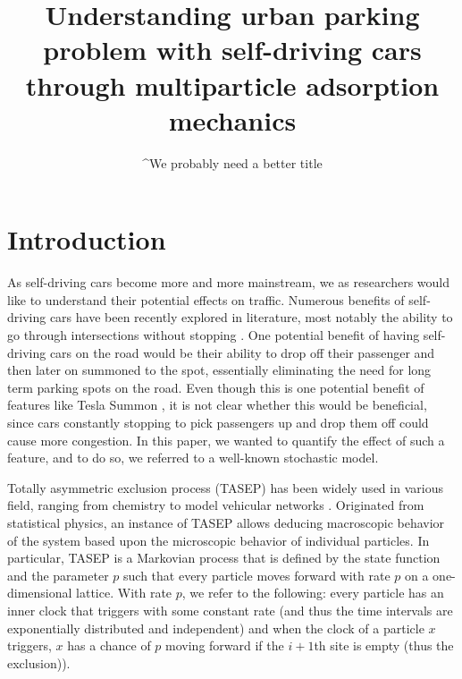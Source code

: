\documentclass[]{article}
\title{Understanding urban parking problem with self-driving cars through multiparticle adsorption mechanics}
\author{^We probably need a better title}
\begin{document}
\maketitle

\section*{Introduction}








As self-driving cars become more and more mainstream, we as researchers would like to understand their potential effects on traffic. Numerous benefits of self-driving cars have been recently explored in literature, most notably the ability to go through intersections without stopping \cite{mitSmartIntersect}. One potential benefit of having self-driving cars on the road would be their ability to drop off their passenger and then later on summoned to the spot, essentially eliminating the need for long term parking spots on the road. Even though this is one potential benefit of features like Tesla Summon \cite{teslaSummon}, it is not clear whether this would be beneficial, since cars constantly stopping to pick passengers up and drop them off could cause more congestion. In this paper, we wanted to quantify the effect of such a feature, and to do so, we referred to a well-known stochastic model. 

Totally asymmetric exclusion process (TASEP) has been widely used in various field, ranging from chemistry \cite{chemCoupled} to model vehicular networks \cite{statPhys}. Originated from statistical physics, an instance of TASEP allows deducing macroscopic behavior of the system based upon the microscopic behavior of individual particles. In particular, TASEP is a Markovian process that is defined by the state function and the parameter $p$ such that every particle moves forward with rate $p$ on a one-dimensional lattice. With rate $p$, we refer to the following: every particle has an inner clock that triggers with some constant rate (and thus the time intervals are exponentially distributed and independent) and when the clock of a particle $x$ triggers, $x$ has a chance of $p$ moving forward if the $i+1$th site is empty (thus the exclusion)).   
\end{document}
